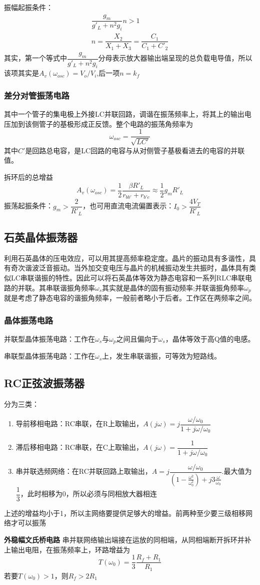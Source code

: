 \documentclass{ctexart}
\newcommand*{\noindbfquad}[1]{{\noindent \bf{#1} \qquad}}
\begin{document}
振幅起振条件：
\begin{align}
    \dfrac{g_m}{g'_L+n^2 g_i}n>1\\
    n=\dfrac{X_2}{X_1+X_3}=\dfrac{C_1}{C_1+C'_2}
\end{align}
其实，第一个等式中$\dfrac{g_m}{g'_L+n^2 g_i}$分母表示放大器输出端呈现的总负载电导值，所以该项其实是$A_v(\omega_{osc})=V_o/V_i$,后一项$n=k_f$
\subsubsection{差分对管振荡电路}
其中一个管子的集电极上外接LC并联回路，调谐在振荡频率上，将其上的输出电压加到该侧管子的基极形成正反馈。整个电路的振荡角频率为
\begin{equation}
    \omega_{osc}=\dfrac{1}{\sqrt{LC'}}
\end{equation}
其中$C'$是回路总电容，是LC回路的电容与从对侧管子基极看进去的电容的并联值。

拆环后的总增益
\begin{equation}
    A_v(\omega_{osc})=\dfrac{1}{2}\dfrac{\beta R'_L}{r_{bb'}+r_{b'e}}\approx \dfrac{1}{2}g_m R'_L
\end{equation}
振荡起振条件：$g_m>\dfrac{2}{R'_L}$，也可用直流电流偏置表示：$I_0>\dfrac{4V_T}{R'_L}$
\subsection{石英晶体振荡器}
利用石英晶体的压电效应，可以用其提高频率稳定度。晶片的振动具有多谐性，具有奇次谐波泛音振动。当外加交变电压与晶片的机械振动发生共振时，晶体具有类似LC串联谐振的特性。因此可以将石英晶体等效为静态电容和一系列RLC串联电路的并联。其串联谐振角频率$\omega_s$其实就是晶体的固有振动频率;并联谐振角频率$\omega_p$就是考虑了静态电容的谐振角频率，一般前者略小于后者。工作区在两频率之间。

\subsubsection{晶体振荡电路}
并联型晶体振荡电路：工作在$\omega_s$与$\omega_p$之间且偏向于$\omega_s$，晶体等效于高Q值的电感。

串联型晶体振荡电路：工作在$\omega_s$上，发生串联谐振，可等效为短路线。
\subsection{RC正弦波振荡器}
分为三类：
\begin{enumerate}
    \item 导前移相电路：RC串联，在R上取输出，$A(j\omega)=j\dfrac{\omega/\omega_0}{1+j\omega/\omega_0}$
    \item 滞后移相电路：RC串联，在C上取输出，$A(j\omega)=\dfrac{1}{1+j\omega/\omega_0}$
    \item 串并联选频网络：在RC并联回路上取输出，$A=j\dfrac{\omega/\omega_0}{(1-\frac{\omega^2}{\omega_0^2})+j3\frac{\omega}{\omega_0}}$.最大值为$\dfrac{1}{3}$，此时相移为0，所以必须与同相放大器相连
\end{enumerate}
上述的增益均小于1，所以主网络要提供足够大的增益。前两种至少要三级相移网络才可以振荡

\noindbfquad{外稳幅文氏桥电路}
串并联网络输出端接在运放的同相端，从同相端断开拆环并补上输出电阻，在振荡频率上，环路增益为
\begin{equation}
    T(\omega_0)=\dfrac{1}{3}\dfrac{R_f + R_1}{R_1}
\end{equation}
若要$T(\omega_0)>1$，则$R_f>2R_1$
\end{document}
